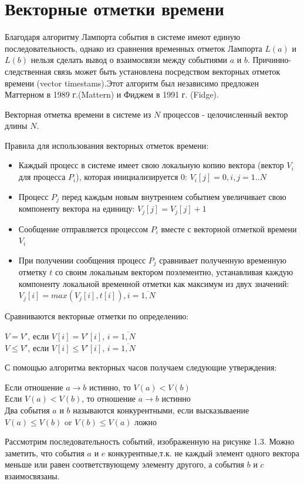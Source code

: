 \section{Векторные отметки времени} 
Благодаря алгоритму Лампорта события в системе имеют единую последовательность, однако из сравнения временных отметок Лампорта $L(a)$ и $L(b)$  нельзя сделать вывод о взаимосвязи между событиями $a$ и $b$. Причинно-следственная связь может быть установлена посредством векторных
отметок времени (vector timestams).Этот алгоритм был независимо предложен Маттерном в 1989 г.(Mattern) и Фиджем в 1991 г. (Fidge).\par
Векторная отметка времени в системе из $N$ процессов - целочисленный вектор длины $N$.\par
Правила для использования векторных отметок времени:  
\begin{itemize}
\item Каждый процесс в системе имеет свою локальную копию вектора (вектор $V_i$ для процесса $P_i$), которая инициализируется $0$: $V_i[j] = 0, i,j = 1..N$ 
\item Процесс $P_j$ перед каждым новым внутреннем событием увеличивает свою компоненту вектора на единицу: $V_j[j] = V_j[j] + 1$
\item Сообщение отправляется процессом $P_i$ вместе с векторной отметкой времени $V_i$
\item При получении сообщения процесс $P_j$ сравнивает полученную временную отметку $t$ со своим локальным вектором поэлементно, устанавливая каждую компоненту локальной временной отметки как максимум из двух значений: $V_j[i] = max(V_j[i],t[i]), i = \overline{1,N}$
\end{itemize}
Сравниваются векторные отметки по определению: 
\begin{center}
$V = V'$, если $V[i] = V'[i]$, $i = \overline{1,N}$ \\
$V \leq V'$, если $V[i] \leq V'[i]$, $i = \overline{1,N}$ 
\end{center}
С помощью алгоритма векторных часов получаем следующие утверждения:
\begin{center}
Если отношение $a \rightarrow b$ истинно, то $V(a) < V(b)$\\
Если $V(a) < V(b)$, то отношение $a \rightarrow b$ истинно \\
Два события $a$ и $b$ называются конкурентными, если высказываение $V(a)\leq V(b)$ or $V(b)\leq V(a)$ ложно
\end{center}
Рассмотрим последовательность событий, изображенную на рисунке 1.3. Можно заметить, что события $a$ и $e$ конкурентные,т.к. не каждый элемент одного вектора меньше или равен соответствующему элементу другого, а события $b$ и $c$ взаимосвязаны. 

